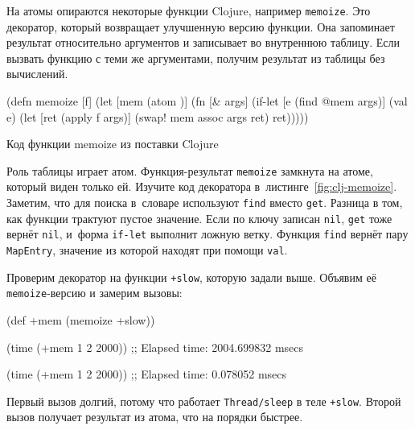 На атомы опираются некоторые функции Clojure, например \verb|memoize|. Это
декоратор, который возвращает улучшенную версию функции. Она запоминает
результат относительно аргументов и записывает во внутреннюю таблицу. Если
вызвать функцию с теми же аргументами, получим результат из таблицы без
вычислений.

\begin{listing}[ht!]

\begin{english}
  \begin{clojure}
(defn memoize [f]
  (let [mem (atom {})]
    (fn [& args]
      (if-let [e (find @mem args)]
        (val e)
        (let [ret (apply f args)]
          (swap! mem assoc args ret)
          ret)))))
  \end{clojure}
\end{english}

\caption{Код функции memoize из поставки Clojure}
\label{fig:clj-memoize}

\end{listing}


Роль таблицы играет атом. Функция-ре\-зуль\-тат \verb|memoize| замкнута на атоме,
который виден только ей. Изучите код декоратора
в~листинге~\ref{fig:clj-memoize}. Заметим, что для поиска в~словаре используют
\verb|find| вместо \verb|get|. Разница в том, как функции трактуют пустое
значение. Если по ключу записан \verb|nil|, \verb|get| тоже вернёт \verb|nil|,
и~форма \verb|if-let| выполнит ложную ветку. Функция \verb|find| вернёт пару
\verb|MapEntry|, значение из которой находят при помощи \verb|val|.

Проверим декоратор на функции \verb|+slow|, которую задали выше. Объявим её
\verb|memoize|-версию и замерим вызовы:

\begin{english}
  \begin{clojure}
(def +mem (memoize +slow))

(time (+mem 1 2 2000))
;; Elapsed time: 2004.699832 msecs

(time (+mem 1 2 2000))
;; Elapsed time: 0.078052 msecs
  \end{clojure}
\end{english}


Первый вызов долгий, потому что работает \verb|Thread/sleep| в теле
\verb|+slow|. Второй вызов получает результат из атома, что на порядки
быстрее.

